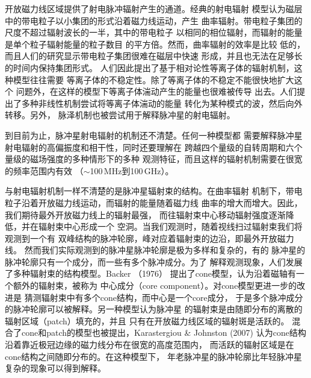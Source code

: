 开放磁力线区域提供了射电脉冲辐射产生的通道。经典的射电辐射
模型认为磁层中的带电粒子以小集团的形式沿着磁力线运动，产生
曲率辐射。带电粒子集团的尺度不超过辐射波长的一半，其中的带电粒子
以相同的相位辐射，而辐射的能量是单个粒子辐射能量的粒子数目
的平方倍\supercite{kom70,rs75}。然而，曲率辐射的效率是比较
低的，而且人们的研究显示带电粒子集团很难在磁层中快速
形成，并且也无法在足够长的时间内保持集团形式\supercite{mel92}。
人们因此提出了基于相对论性等离子体的辐射机制，这种模型往往需要
等离子体的不稳定性。除了等离子体的不稳定不能很快地扩大这个
问题外，在这样的模型下等离子体湍动产生的能量也很难被传导
出去。人们提出了多种非线性机制尝试将等离子体湍动的能量
转化为某种模式的波，然后向外转移\supercite{mel92}。另外，
脉泽机制也被尝试用于解释脉冲星的射电辐射\supercite{mel89}。

到目前为止，脉冲星射电辐射的机制还不清楚。任何一种模型都
需要解释脉冲星射电辐射的高偏振度和相干性，同时还要理解在
跨越四个量级的自转周期和六个量级的磁场强度的多种情形下的多种
观测特征，而且这样的辐射机制需要在很宽的频率范围内有效
（$\sim$100\,MHz到100\,GHz）。

与射电辐射机制一样不清楚的是脉冲星辐射束的结构。在曲率辐射
机制下，带电粒子沿着开放磁力线运动，而辐射的能量随着磁力线
曲率的增大而增大。因此，我们期待最外开放磁力线上的辐射最强，
而往辐射束中心移动辐射强度逐渐降低，并在辐射束中心形成一个
空洞。当我们观测时，随着视线扫过辐射束我们将观测到一个有
双峰结构的脉冲轮廓，峰对应着辐射束的边沿，即最外开放磁力线。
然而我们实际观测到的脉冲星脉冲轮廓是极为多样和复杂的，有的
脉冲星的脉冲轮廓只有一个成分，而一些有多个脉冲成分。为了
解释观测现象，人们发展了多种辐射束的结构模型。Backer （1976）\supercite{bac76}
提出了cone模型，认为沿着磁轴有一个额外的辐射束，被称为
中心成分（core component）。对cone模型更进一步的改进是
猜测辐射束中有多个cone结构，而中心是一个core成分\supercite{os76,os77,Rankin93,gks93}，
于是多个脉冲成分的脉冲轮廓可以被解释。另一种模型认为脉冲星
的辐射束是由随即分布的离散的辐射区域（patch）填充的，并且
只有在开放磁力线区域的辐射斑是活跃的\supercite{Lyne88}。
混合了cone和patch的模型也被提出，Karastergiou \& Johnston (2007)\supercite{Kara07}
认为cone结构沿着靠近极冠边缘的磁力线分布在很宽的高度范围内，
而活跃的辐射区域是在cone结构之间随即分布的。在这种模型下，
年老脉冲星的脉冲轮廓比年轻脉冲星复杂的现象可以得到解释。

